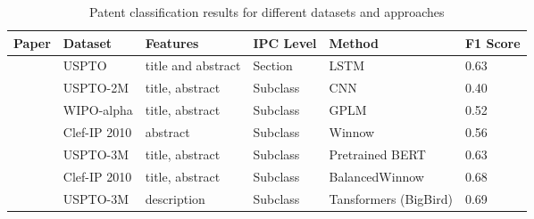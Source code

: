 \begin{table}
\centering
\begin{adjustbox}{width=\textwidth}
\begin{tabular}{@{}llllll@{}}
\toprule
Paper                       & Dataset         & Features                                         & IPC Level & Method                                                   & F1 Score \\ \midrule
\cite{Grawe-word-embedding} & USPTO & title and abstract                               & Section                  & LSTM                                                     & 0.63  \\
\cite{DeepPatent}           & USPTO-2M        & title, abstract                                  & Subclass                 & CNN                      & 0.40     \\
\cite{lit_aiolli}             & WIPO-alpha      & title, abstract & Subclass                 & GPLM             & 0.52     \\
\cite{lit_verbene_1}         & Clef-IP 2010    & abstract                                         & Subclass                 & Winnow                                                   & 0.56     \\
\cite{Lee-BERT}             & USPTO-3M        & title, abstract                                  & Subclass                 & Pretrained BERT                                          & 0.63     \\
\cite{lit_beney_clef_ip_2010}     & Clef-IP 2010    & title, abstract                           & Subclass                 & BalancedWinnow                                           & 0.68     \\
\cite{BigBird}              & USPTO-3M        & description                                  & Subclass                 & Tansformers (BigBird)                                    & 0.69

\end{tabular}
\end{adjustbox}
\caption{Patent classification results for different datasets and approaches}
\label{tab:literature_results}
\end{table}